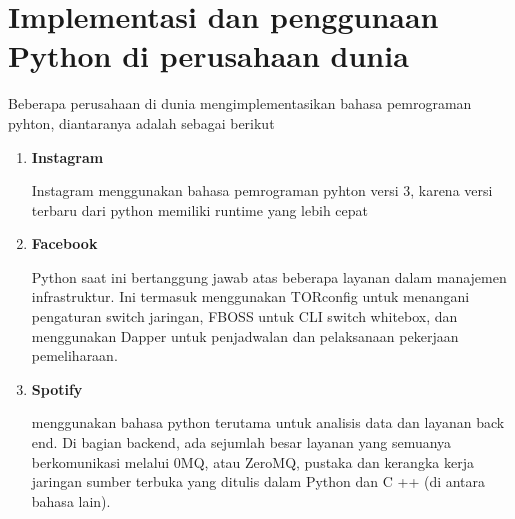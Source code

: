 \section{Implementasi dan penggunaan Python di perusahaan dunia}
Beberapa perusahaan di dunia mengimplementasikan bahasa pemrograman pyhton, diantaranya adalah sebagai berikut
\begin{enumerate}
\item \textbf{Instagram}
\par 
Instagram menggunakan bahasa pemrograman pyhton versi 3, karena versi terbaru dari python memiliki runtime yang lebih cepat
\item \textbf{Facebook}
\par 
Python saat ini bertanggung jawab atas beberapa layanan dalam manajemen infrastruktur. Ini termasuk menggunakan TORconfig untuk menangani pengaturan switch jaringan, FBOSS untuk CLI switch whitebox, dan menggunakan Dapper untuk penjadwalan dan pelaksanaan pekerjaan pemeliharaan.
\item \textbf{Spotify}
\par 
menggunakan bahasa python terutama untuk analisis data dan layanan back end. Di bagian backend, ada sejumlah besar layanan yang semuanya berkomunikasi melalui 0MQ, atau ZeroMQ, pustaka dan kerangka kerja jaringan sumber terbuka yang ditulis dalam Python dan C ++ (di antara bahasa lain).
\end{enumerate}
